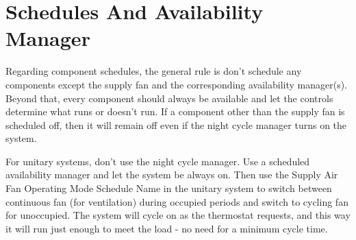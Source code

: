 \section{Schedules And Availability Manager}

Regarding component schedules, the general rule is don't schedule any components except the supply fan and the corresponding availability manager(s). Beyond that, every component should always be available and let the controls determine what runs or doesn't run. If a component other than the supply fan is scheduled off, then it will remain off even if the night cycle manager turns on the system.

For unitary systems, don't use the night cycle manager. Use a scheduled availability manager and let the system be always on. Then use the Supply Air Fan Operating Mode Schedule Name in the unitary system to switch between continuous fan (for ventilation) during occupied periods and switch to cycling fan for unoccupied. The system will cycle on as the thermostat requests, and this way it will run just enough to meet the load - no need for a minimum cycle time.
